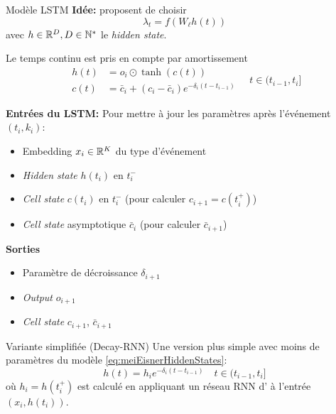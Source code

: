 \documentclass[../main.tex]{subfiles}
\begin{document}
\begin{frame}{Modèle LSTM \parencite{meiEisnerNeuralHawkes}}
\textbf{Idée:} \citeauthor{meiEisnerNeuralHawkes} proposent de choisir 
\begin{equation}
\lambda_t = f(W_\ell h(t))
\end{equation}
avec $h\in\mathbb{R}^D, D\in\mathbb{N}^*$ le \textit{hidden state}. \autocite{meiEisnerNeuralHawkes}

Le temps continu est pris en compte par amortissement
\begin{equation}\label{eq:meiEisnerHiddenStates}
	\begin{aligned}
	h(t) &= o_i \odot \tanh(c(t)) \\
	c(t) &= \bar{c}_i + (c_i - \bar{c}_i)e^{-\delta_i(t - t_{i-1})}
	\end{aligned} \quad t\in(t_{i-1}, t_i]
\end{equation}
\end{frame}

\begin{frame}
\textbf{Entrées du LSTM:} Pour mettre à jour les paramètres après l'événement $(t_i,k_i)$:\begin{itemize}
	\item[\textbullet] Embedding $x_i\in\mathbb{R}^K$ du type d'événement
	\item[\textbullet] \textit{Hidden state} $h(t_{i})$ en $t_{i}^{-}$
	\item[\textbullet] \textit{Cell state} $c(t_{i})$ en $t_i^{-}$ (pour calculer $c_{i+1} = c(t_i^{+})$)
	\item[\textbullet] \textit{Cell state} asymptotique $\bar{c}_i$ (pour calculer $\bar{c}_{i+1}$)
\end{itemize}

\textbf{Sorties}\begin{itemize}
	\item[\textbullet] Paramètre de décroissance $\delta_{i+1}$
	\item[\textbullet] \textit{Output} $o_{i+1}$
	\item[\textbullet] \textit{Cell state} $c_{i+1}$, $\bar{c}_{i+1}$
\end{itemize}
\end{frame}


\begin{frame}{Variante simplifiée (Decay-RNN)}
Une version plus simple avec moins de paramètres du modèle \eqref{eq:meiEisnerHiddenStates}:
\begin{equation}
h(t) = h_i e^{-\delta_i (t - t_{i-1})}
\quad t\in (t_{i-1}, t_i]
\end{equation}
où $h_i = h(t_i^{+})$ est calculé en appliquant un réseau RNN d'\citeauthor{elman1990srnn} à l'entrée $(x_i, h(t_i))$.

\end{frame}
\end{document}
